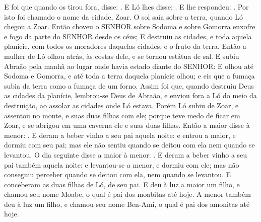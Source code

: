 {E foi que quando os tirou fora, disse: . %
E Ló lhes disse: .
E lhe respondeu: . Por isto foi chamado o nome da cidade, Zoar.
O sol saía sobre a terra, quando Ló chegou a Zoar.
Então choveu o SENHOR sobre Sodoma e sobre Gomorra enxofre e fogo da parte do SENHOR desde os céus;
E destruiu as cidades, e toda aquela planície, com todos os moradores daquelas cidades, e o fruto da terra.
Então a mulher de Ló olhou atrás, às costas dele, e se tornou estátua de sal. %
E subiu Abraão pela manhã ao lugar onde havia estado diante do SENHOR:
E olhou até Sodoma e Gomorra, e até toda a terra daquela planície olhou; e eis que a fumaça subia da terra como a fumaça de um forno.
Assim foi que, quando destruiu Deus as cidades da planície, lembrou-se Deus de Abraão, e enviou fora a Ló do meio da destruição, ao assolar as cidades onde Ló estava.
Porém Ló subiu de Zoar, e assentou no monte, e suas duas filhas com ele; porque teve medo de ficar em Zoar, e se abrigou em uma caverna ele e suas duas filhas.
Então a maior disse à menor: .
E deram a beber vinho a seu pai aquela noite: e entrou a maior, e dormiu com seu pai; mas ele não sentiu quando se deitou com ela nem quando se levantou.
O dia seguinte disse a maior à menor: .
E deram a beber vinho a seu pai também aquela noite: e levantou-se a menor, e dormiu com ele; mas não conseguiu perceber quando se deitou com ela, nem quando se levantou.
E conceberam as duas filhas de Ló, de seu pai.
E deu à luz a maior um filho, e chamou seu nome Moabe, o qual é pai dos moabitas até hoje.
A menor também deu à luz um filho, e chamou seu nome Ben-Ami, o qual é pai dos amonitas até hoje.
\par}


